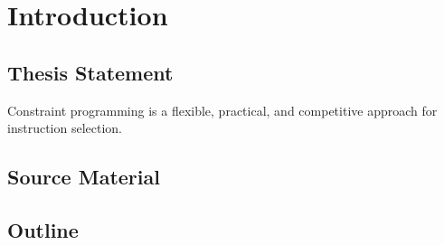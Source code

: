 %

\chapter{Introduction}

\section{Thesis Statement}

\begin{statement}
  Constraint programming is a flexible, practical, and competitive approach for
  instruction selection.
\end{statement}

\section{Source Material}

\section{Outline}
